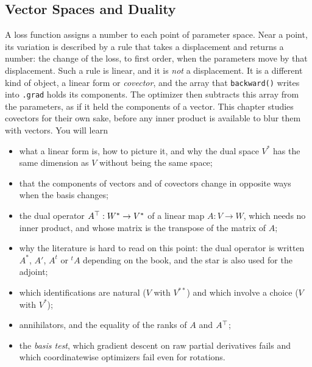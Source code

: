 \begin{notechapter}
\chapter{Vector Spaces and Duality}
\label{ch:duality}

\begin{chapterintro}
A loss function assigns a number to each point of parameter space. Near a
point, its variation is described by a rule that takes a displacement and
returns a number: the change of the loss, to first order, when the
parameters move by that displacement. Such a rule is linear, and it is
\emph{not} a displacement. It is a different kind of object, a linear form
or \emph{covector}, and the array that \texttt{backward()} writes into
\texttt{.grad} holds its components. The optimizer then subtracts this
array from the parameters, as if it held the components of a vector. This
chapter studies covectors for their own sake, before any inner product is
available to blur them with vectors. You will learn
\begin{itemize}[nosep]
  \item what a linear form is, how to picture it, and why the dual space
        $V^*$ has the same dimension as $V$ without being the same space;
  \item that the components of vectors and of covectors change in opposite
        ways when the basis changes;
  \item the dual operator $A^{\top}:W^*\to V^*$ of a linear map
        $A:V\to W$, which needs no inner product, and whose matrix is the
        transpose of the matrix of $A$;
  \item why the literature is hard to read on this point: the dual
        operator is written $A^*$, $A'$, $A^t$ or ${}^t\!A$ depending on
        the book, and the star is also used for the adjoint;
  \item which identifications are natural ($V$ with $V^{**}$) and which
        involve a choice ($V$ with $V^*$);
  \item annihilators, and the equality of the ranks of $A$ and $A^{\top}$;
  \item the \emph{basis test}, which gradient descent on raw partial
        derivatives fails and which coordinatewise optimizers fail even
        for rotations.
\end{itemize}
\end{chapterintro}


\end{notechapter}
